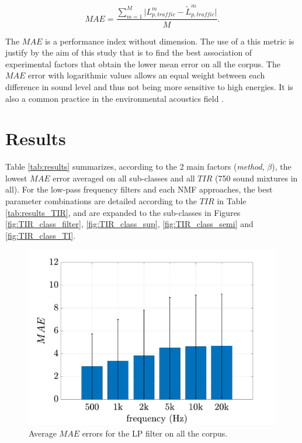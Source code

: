 \documentclass[twocolumn]{svjour3}          %
\begin{document}
\begin{equation}
MAE = \frac{\sum_{m = 1}^M\vert L^m_{p,traffic}-\tilde{L}^m_{p,traffic} \vert}{M}.
\end{equation}

The $MAE$ is a performance index without dimension. The use of a this metric is justify by the aim of this study that is to find the best association of experimental factors that obtain the lower mean error on all the corpus. The $MAE$ error with logarithmic values allows an equal weight between each difference in sound level and thus not being more sensitive to high energies. It is also a common practice in the environmental acoustics field \cite{morillas2014uncertainty} \cite{aumond2018kriging}.

\section{Results}\label{part:results}

Table \ref{tab:results} summarizes, according to the 2 main factors (\textit{method}, $\beta$), the lowest $MAE$ error averaged on all sub-classes and all $TIR$ (750 sound mixtures in all). For the low-pass frequency filters and each NMF approaches, the best parameter combinations are detailed according to the $TIR$ in Table \ref{tab:results_TIR},  and are expanded to the sub-classes in Figures \ref{fig:TIR_class_filter}, \ref{fig:TIR_class_sup}, \ref{fig:TIR_class_semi} and \ref{fig:TIR_class_TI}. \\

\begin{figure}[t]
\centering
\includegraphics[width=\linewidth]{./figures/filter_bar_integrate.pdf}
\caption{Average $MAE$ errors for the LP filter on all the corpus.}
\label{fig:filter_intergate}
\end{figure}
\end{document}
